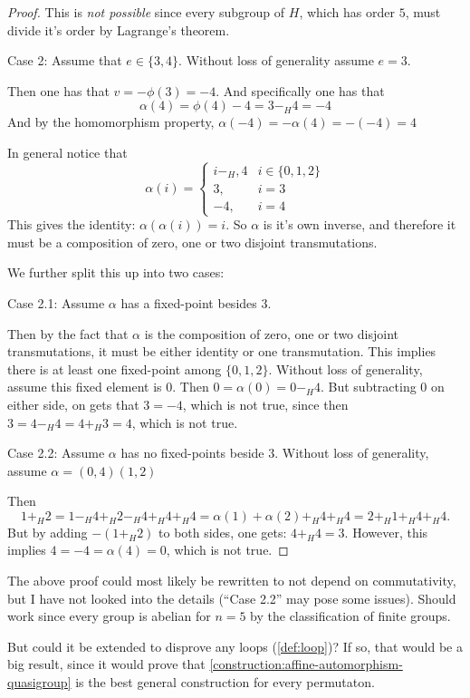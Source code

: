 \begin{proof}
    This is \emph{not possible} since every subgroup of \( H \), which has order \( 5 \), must divide it's order by Lagrange's theorem.

    Case 2: Assume that \( e \in \{ 3, 4 \} \). Without loss of generality assume \( e = 3 \).

    Then one has that \( v = -\phi(3) = -4 \). And specifically one has that
    \[
        \alpha(4) = \phi(4) - 4 = 3 -_H 4 = - 4
    \]
    And by the homomorphism property, \( \alpha(-4) = -\alpha(4) = -(-4) = 4 \)

    In general notice that
    \[
        \alpha(i) =
        \begin{cases}
            i -_H, 4 & i \in \{ 0, 1, 2 \} \\
            3, & i = 3 \\
            -4, & i = 4
        \end{cases}
    \]
    This gives the identity: \( \alpha(\alpha(i)) = i \). So \( \alpha \) is it's own inverse, and therefore it must be a composition of zero, one or two disjoint transmutations.

    We further split this up into two cases:

    Case 2.1: Assume \( \alpha \) has a fixed-point besides \( 3 \).

    Then by the fact that \( \alpha \) is the composition of zero, one or two disjoint transmutations, it must be either identity or one transmutation. This implies there is at least one fixed-point among \( \{ 0, 1, 2 \} \). Without loss of generality, assume this fixed element is \( 0 \). Then \( 0 = \alpha(0) = 0 -_H 4 \). But subtracting \( 0 \) on either side, on gets that \( 3 = -4 \), which is not true, since then \( 3 = 4 -_H 4 = 4 +_H 3 = 4 \), which is not true.

    Case 2.2: Assume \( \alpha \) has no fixed-points beside \( 3 \). Without loss of generality, assume \( \alpha = (0, 4)(1, 2) \)

    Then 
    \[ 
        1 +_H 2 = 1 -_H 4 +_H 2 -_H 4 +_H 4 +_H 4 = \alpha(1) + \alpha(2) +_H 4 +_H 4 = 2 +_H 1 +_H 4 +_H 4.
    \]
    But by adding \( -(1 +_H 2) \) to both sides, one gets: \( 4 +_H 4 = 3\). However, this implies \( 4 = -4 = \alpha(4) = 0 \), which is not true.
\end{proof}

\begin{remark} \label{remark:ab-aaut-counterexample-notes}
    The above proof could most likely be rewritten to not depend on commutativity, but I have not looked into the details (``Case 2.2'' may pose some issues). Should work since every group is abelian for \( n = 5 \) by the classification of finite groups. 
    
    But could it be extended to disprove any loops (\autoref{def:loop})? If so, that would be a big result, since it would prove that \autoref{construction:affine-automorphism-quasigroup} is the best general construction for every permutaton.
\end{remark}